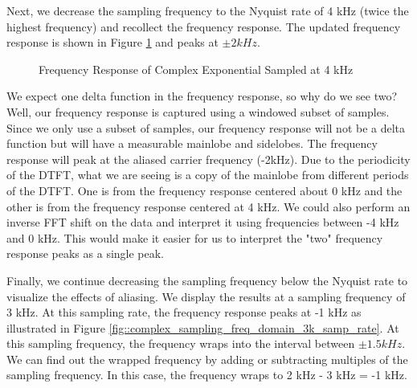 \documentclass{article}
\begin{document}
Next, we decrease the sampling frequency to the Nyquist rate of 4 kHz (twice the highest frequency) and recollect the frequency response. The updated frequency response is shown in Figure \ref{fig::complex_sampling_freq_domain_4k_samp_rate} and peaks at $\pm 2 kHz$.

\begin{figure}[H]
	\centerline{}
	\caption{Frequency Response of Complex Exponential Sampled at 4 kHz}
	\label{fig::complex_sampling_freq_domain_4k_samp_rate}
\end{figure}

We expect one delta function in the frequency response, so why do we see two? Well, our frequency response is captured using a windowed subset of samples. Since we only use a subset of samples, our frequency response will not be a delta function but will have a measurable mainlobe and sidelobes. The frequency response will peak at the aliased carrier frequency (-2kHz). Due to the periodicity of the DTFT, what we are seeing is a copy of the mainlobe from different periods of the DTFT. One is from the frequency response centered about 0 kHz and the other is from the frequency response centered at 4 kHz. We could also perform an inverse FFT shift on the data and interpret it using frequencies between -4 kHz and 0 kHz. This would make it easier for us to interpret the "two" frequency response peaks as a single peak.

Finally, we continue decreasing the sampling frequency below the Nyquist rate to visualize the effects of aliasing. We display the results at a sampling frequency of 3 kHz. At this sampling rate, the frequency response peaks at -1 kHz as illustrated in Figure \ref{fig::complex_sampling_freq_domain_3k_samp_rate}. At this sampling frequency, the frequency wraps into the interval between $\pm 1.5 kHz$. We can find out the wrapped frequency by adding or subtracting multiples of the sampling frequency. In this case, the frequency wraps to 2 kHz - 3 kHz = -1 kHz.
\end{document}
